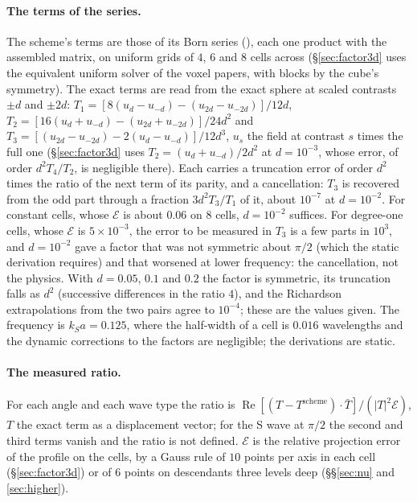 \documentclass[11pt,a4paper]{article}
\newcommand{\cE}{\mathcal{E}}
\begin{document}
\paragraph{The terms of the series.} The scheme's terms are those of its Born series
(), each one product with the assembled matrix, on uniform grids of
$4$, $6$ and $8$ cells across (\S\ref{sec:factor3d} uses the equivalent uniform solver of the voxel
papers, with blocks by the cube's symmetry). The exact terms are read from the exact sphere at scaled
contrasts $\pm d$ and $\pm2d$:
$T_1=[8(u_d-u_{-d})-(u_{2d}-u_{-2d})]/12d$,
$T_2=[16(u_d+u_{-d})-(u_{2d}+u_{-2d})]/24d^2$ and
$T_3=[(u_{2d}-u_{-2d})-2(u_d-u_{-d})]/12d^3$, $u_s$ the field at contrast $s$ times the full one
(\S\ref{sec:factor3d} uses $T_2=(u_d+u_{-d})/2d^2$ at $d=10^{-3}$, whose error, of order $d^2T_4/T_2$, is
negligible there). Each
carries a truncation error of order $d^2$ times the ratio of the next term of its parity, and a
cancellation: $T_3$ is recovered from the odd part through a fraction $3d^2T_3/T_1$ of it, about
$10^{-7}$ at $d=10^{-2}$. For constant cells, whose $\cE$ is about $0.06$ on $8$ cells, $d=10^{-2}$
suffices. For degree-one cells, whose $\cE$ is $5\times10^{-3}$, the error to be measured in $T_3$ is a few
parts in $10^3$, and $d=10^{-2}$ gave a factor that was not symmetric about $\pi/2$ (which the static
derivation requires) and that worsened at lower frequency: the cancellation, not the physics. With
$d=0.05$, $0.1$ and $0.2$ the factor is symmetric, its truncation falls as $d^2$ (successive differences
in the ratio $4$), and the Richardson extrapolations from the two pairs agree to $10^{-4}$; these are the
values given. The frequency is $k_Sa=0.125$, where the half-width of a cell is $0.016$ wavelengths and
the dynamic corrections to the factors are negligible; the derivations are static.

\paragraph{The measured ratio.} For each angle and each wave type the ratio is
$\operatorname{Re}[(T-T^{\mathrm{scheme}})\cdot\bar T]/(\lvert T\rvert^2\cE)$, $T$ the exact term as a
displacement vector; for the S wave at $\pi/2$ the second and third terms vanish and the ratio is not
defined. $\cE$ is the relative projection error of the profile on the cells, by a Gauss rule of $10$
points per axis in each cell (\S\ref{sec:factor3d}) or of $6$ points on descendants three levels deep
(\S\S\ref{sec:nu} and \ref{sec:higher}).
\end{document}
